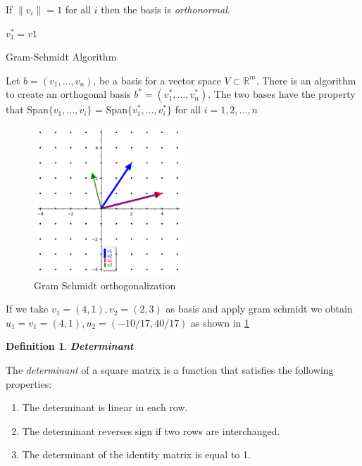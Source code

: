\documentclass[a4paper,12pt]{report}
\newtheorem{definition}{Definition}[section]
\newcommand{\R}{\mathbb{R}}
\begin{document}
If $\lVert v_i \rVert = 1$ for all $i$ then the basis is \textit{orthonormal}.

\begin{algorithm}[H]
    \vspace*{5px}
    $v_1^* = v1$\;
    \\
    \caption{Gram-Schmidt Algorithm}
    \label{alg:gram_schmidt}
\end{algorithm}

Let $b = (v_1, \ldots, v_n)$, be a basis for a vector space $V \subset \R^m$. There is an algorithm to create an orthogonal basis
$b^* = (v_1^*,\ldots,v_n^*)$.
The two bases have the property that Span$\{v_1,\ldots,v_i\}$ = Span$\{v_1^*,\ldots,v_i^*\}$ for all $i = 1,2,\ldots,n$

\begin{figure}[htpb]
    \centering
    \includegraphics[width=0.5\textwidth]{./img/gram_schmidt.png}
    \caption{Gram Schmidt orthogonalization}
    \label{fig:gram_schmidt}
\end{figure}

If we take $v_1=(4, 1), v_2=(2, 3)$ as basis and apply gram schmidt we obtain $u_1=v_1=(4, 1), u_2=(-10/17, 40/17)$ as shown in \ref{fig:gram_schmidt}

\begin{definition}
    \textbf{Determinant}
\end{definition}

The \textit{determinant} of a square matrix is a function that satisfies the following properties:

\begin{enumerate}
    \item The determinant is linear in each row.
    \item The determinant reverses sign if two rows are interchanged.
    \item The determinant of the identity matrix is equal to 1.
\end{enumerate}
\end{document}
